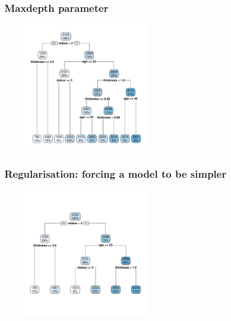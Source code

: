 \documentclass[handout, aspectratio = 169]{beamer}
\begin{document}
\begin{frame}
\frametitle{\insertframenumber~Maxdepth parameter}
\vspace{-4mm}
\begin{figure}
    \includegraphics[width = 0.5\textwidth]{rpart_depth6.pdf}
\end{figure} 

\end{frame} 




\begin{frame}
\frametitle{\insertframenumber~Regularisation: forcing a model to be simpler}
\vspace{-4mm}
\begin{figure}
    \includegraphics[width = 0.5\textwidth]{rpart_depth3.pdf}
\end{figure} 
\end{frame} 
\end{document}
